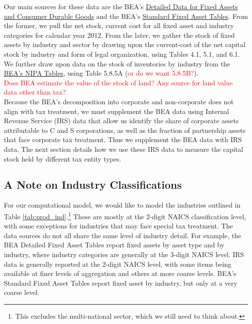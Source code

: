 \documentclass[article,11pt,letterpaper,fleqn]{article}
\theoremstyle{definition}
\numberwithin{equation}{section}
\begin{document}
Our main sources for these data are the BEA's \href{http://www.bea.gov/national/FA2004/Details/Index.html}{Detailed Data for Fixed Assets and Consumer Durable Goods} and the BEA's \href{(http://www.bea.gov/iTable/index_FA.cfm}{Standard Fixed Asset Tables}.  From the former, we pull the net stock, current cost for all fixed asset and industry categories for calendar year 2012.  From the later, we gather the stock of fixed assets by industry and sector by drawing upon the current-cost of the net capital stock by industry and form of legal organization, using Tables 4.1, 5.1, and 6.1.  We further draw upon data on the stock of inventories by industry from the \href{http://www.bea.gov/iTable/index_nipa.cfm}{BEA's NIPA Tables}, using Table 5.8.5A (\textcolor{red}{or do we want 5.8.5B?}).  
\ \\
\textcolor{red}{Does BEA estimate the value of the stock of land?  Any source for land value data other than tax?}
\ \\
Because the BEA's decomposition into corporate and non-corporate does not align with tax treatment, we must supplement the BEA data using Internal Revenue Service (IRS) data that allow us identify the share of corporate assets attributable to C and S corporations, as well as the fraction of partnership assets that face corporate tax treatment.  Thus we supplement the BEA data with IRS data.  The next section details how we use these IRS data to measure the capital stock held by different tax entity types.

\subsection{A Note on Industry Classifications}

For our computational model, we would like to model the industries outlined in Table \ref{tab:prod_ind}.\footnote{This excludes the multi-national sector, which we still need to think about.}  These are mostly at the 2-digit NAICS classification level, with some exceptions for industries that may face special tax treatment.  The data sources do not all share the same level of industry detail.  For example, the BEA Detailed Fixed Asset Tables report fixed assets by asset type and by industry, where industry categories are generally at the 3-digit NAICS level.  IRS data is generally reported at the 2-digit NAICS level, with some items being available at finer levels of aggregation and others at more coarse levels.  BEA's Standard Fixed Asset Tables report fixed asset by industry, but only at a very coarse level.  
\end{document}
